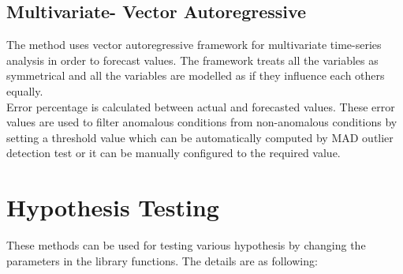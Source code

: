 \subsection{Multivariate- Vector Autoregressive}
The method uses vector autoregressive framework for multivariate time-series analysis in order to forecast values. The framework treats all the variables as symmetrical and all the variables are modelled as if they influence each others equally.
\\
Error percentage is calculated between actual and forecasted values. These error values are used to filter anomalous conditions from non-anomalous conditions by setting a threshold value which can be automatically computed by MAD outlier detection test or it can be manually configured to the required value.
\section{Hypothesis Testing}
These methods can be used for testing various hypothesis by changing the parameters in the library functions. The details are as following:
